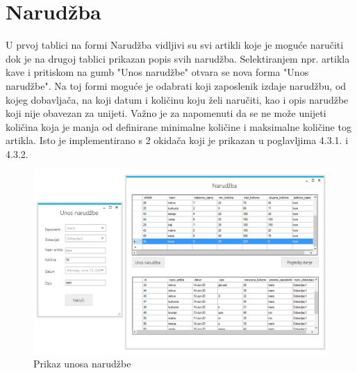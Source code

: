 \documentclass{foi}
\begin{document}
\section{Narudžba}
U prvoj tablici na formi Narudžba vidljivi su svi artikli koje je moguće naručiti dok je na drugoj tablici prikazan popis svih narudžba. Selektiranjem npr. artikla kave i pritiskom na gumb "Unos narudžbe" otvara se nova forma "Unos narudžbe". Na toj formi moguće je odabrati koji zaposlenik izdaje narudžbu, od kojeg dobavljača, na koji datum i količinu koju želi naručiti, kao i opis narudžbe koji nije obavezan za unijeti. Važno je za napomenuti da se ne može unijeti količina koja je manja od definirane minimalne količine i maksimalne količine tog artikla. Isto je implementirano s 2 okidača koji je prikazan u poglavljima 4.3.1. i 4.3.2.
\begin{figure}[h]
    \centering 
    \includegraphics[width=1.0\textwidth]{slike/unos narudzbe kave.PNG}
    \caption{Prikaz unosa narudžbe}
    \label{slika-11}
\end{figure}
\end{document}
